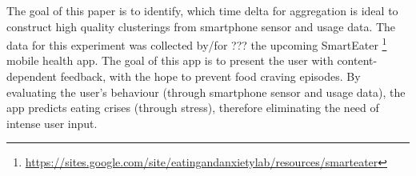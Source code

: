 






The goal of this paper is to identify, which time delta for aggregation is ideal to construct high quality clusterings from smartphone sensor and usage data. The data for this experiment was collected by/for ??? the upcoming SmartEater \footnote{\url{https://sites.google.com/site/eatingandanxietylab/resources/smarteater}} mobile health app. The goal of this app is to present the user with content-dependent feedback, with the hope to prevent food craving episodes. By evaluating the user's behaviour (through smartphone sensor and usage data), the app predicts eating crises (through stress), therefore eliminating the need of intense user input.

